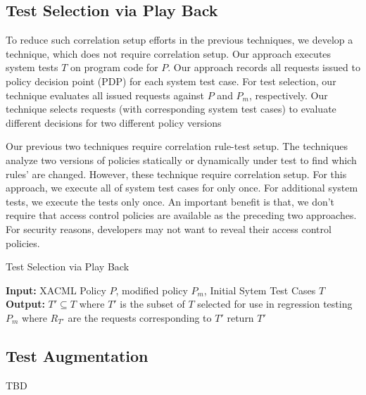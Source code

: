 \subsection{Test Selection via Play Back}

To reduce such correlation setup efforts in the previous techniques, we develop
a technique, which does not require correlation setup. 
Our approach executes system tests $T$ on program code for $P$. Our approach records all requests issued to policy decision point (PDP) for each 
system test case. 
For test selection, our technique evaluates all issued requests against $P$ and $P_m$, respectively.
Our technique selects requests (with corresponding system test cases) to evaluate different decisions for two different policy versions 

Our previous two techniques require correlation rule-test setup. The techniques analyze two versions of policies statically or dynamically 
under test to find which rules' are changed. However, these technique require correlation setup.
For this approach, we execute all of system test cases for only once. For additional system tests, we
execute the tests only once. An important benefit is that, we don't require that access control policies are available as the preceding two
approaches. For security reasons, developers may not want to reveal their access control policies.

\begin{algorithmic}
\begin{algorithm}[t]
\caption{Test Selection via Play Back}
\STATE \textbf{Input:} XACML Policy $P$, modified policy $P_{m}$, Initial Sytem Test Cases $T$
\STATE \textbf{Output:} $T' \subseteq T$ where $T'$ is the subset of $T$ selected for use in regression testing $P_{m}$
 where $R_{T'}$ are the requests corresponding to $T'$ 
\ENDIF
\ENDFOR
{}
\STATE return $T'$
\end{algorithm}
\end{algorithmic}


\subsection{Test Augmentation}
TBD








